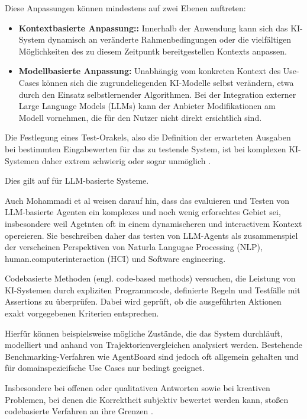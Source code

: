 Diese Anpassungen können mindestens auf zwei Ebenen auftreten:
\begin{itemize}
  \item \textbf{Kontextbasierte Anpassung::} Innerhalb der Anwendung kann sich das KI-System dynamisch an
    veränderte Rahmenbedingungen oder die vielfältigen Möglichkeiten des zu diesem Zeitpuntk bereitgestellen
    Kontexts anpassen.
  \item \textbf{Modellbasierte Anpassung:} Unabhängig vom konkreten Kontext des Use-Cases können sich die
    zugrundeliegenden KI-Modelle selbst verändern, etwa durch den Einsatz selbstlernender Algorithmen. Bei
    der Integration externer Large Language Models (LLMs) kann der Anbieter Modifikationen am Modell
    vornehmen, die für den Nutzer nicht direkt ersichtlich sind.
\end{itemize}
Die Festlegung eines Test-Orakels, also die Definition der erwarteten Ausgaben bei bestimmten Eingabewerten
für das zu testende System, ist bei komplexen KI-Systemen daher extrem schwierig oder sogar
unmöglich \cite[p.~39]{istqbrISTQBCertifiedTester}.

Dies gilt auf für LLM-basierte Systeme.

Auch Mohammadi et al \cite[p. 1]{mohammadiEvaluationBenchmarkingLLM2025} weisen darauf hin, dass das evaluieren und
Testen von LLM-basierte Agenten ein komplexes und noch wenig erforschtes Gebiet sei, insbesondere weil
Agetnten oft in einem dynamischeren und interactivem Kontext opereieren.
Sie beschreiben daher das testen von LLM-Agents als zusammenspiel der verscheinen Perspektiven von Naturla
Langugae Processing (NLP), human.computerinteraction (HCI) und Software engineering.

Codebasierte Methoden (engl. code-based methods) versuchen, die Leistung von KI-Systemen durch expliziten
Programmcode, definierte Regeln und Testfälle mit Assertions zu überprüfen. Dabei wird geprüft, ob die
ausgeführten Aktionen exakt vorgegebenen Kriterien entsprechen. \cite[p. 7]{mohammadiEvaluationBenchmarkingLLM2025}

Hierfür können beispielsweise mögliche Zustände, die das System durchläuft, modelliert und anhand von
Trajektorienvergleichen analysiert werden.
Bestehende Benchmarking-Verfahren wie AgentBoard \cite{maAgentBoardAnalyticalEvaluation2024} sind jedoch oft
allgemein gehalten und für domainspezieifsche Use Cases nur bedingt geeignet.

Insbesondere bei offenen oder qualitativen Antworten sowie bei kreativen Problemen, bei denen die Korrektheit
subjektiv bewertet werden kann, stoßen codebasierte Verfahren an ihre Grenzen
\cite[p.~7]{mohammadiEvaluationBenchmarkingLLM2025}.

